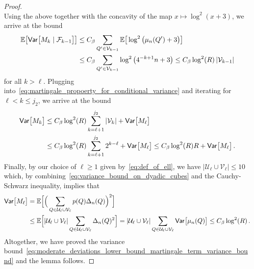 \documentclass[11pt]{amsart}
\theoremstyle{definition}
\theoremstyle{remark}
\numberwithin{equation}{section}
\newcommand{\bE}{\mathbb E}
\newcommand{\Var}{{\sf Var}}
\begin{document}
\begin{proof}
\[		\]
		Using the above together with the concavity of the map $x\mapsto \log^2(x+3)$, we arrive at the bound
		\begin{align*}
			\bE\big[\Var\big[M_k \mid \mathcal{F}_{k-1}\big]\big] & \le C_\beta \sum_{Q^\prime\in \mathcal{V}_{k-1}} \bE\big[\log^2\big( \mu_n(Q^\prime) + 3 \big)\big] \\
			& \le  C_\beta \sum_{Q^\prime\in \mathcal{V}_{k-1}} \log^2\big(4^{-k+1} n + 3\big) \le C_\beta \log^2(R) \, |\mathcal{V}_{k-1}|
		\end{align*}
		for all $k>\ell$. Plugging into~\eqref{eq:martingale_propoerty_for_conditional_variance} and iterating for $\ell<k\le j_2$, we arrive at the bound
		\begin{align*}
			\Var\big[M_k\big] &\le C_\beta \log^2(R) \sum_{k=\ell+1}^{j_2} |\mathcal{V}_{k}| + \Var\big[M_\ell\big]  \\ &\le C_\beta \log^2(R) \sum_{k=\ell+1}^{j_2} 2^{k-\ell} + \Var\big[M_\ell\big] \le C_\beta \log^2(R) R + \Var\big[M_\ell\big] \, . 
		\end{align*}
		Finally, by our choice of $\ell \ge 1$ given by~\eqref{eq:def_of_ell}, we have $|\mathcal{U}_\ell \cup \mathcal{V}_{\ell}|\le 10$ which, by combining~\eqref{eq:variance_bound_on_dyadic_cubes} and the Cauchy-Schwarz inequality, implies that
		\begin{align*}
			\Var\big[M_\ell\big] &= \bE\Big[\Big(\sum_{Q\in \mathcal{U}_\ell \cup \mathcal{V}_\ell} p(Q) \Delta_n(Q)\Big)^2\Big] \\ &\le \bE\Big[|\mathcal{U}_\ell \cup \mathcal{V}_\ell| \sum_{Q\in \mathcal{U}_\ell \cup \mathcal{V}_\ell} \Delta_n(Q)^2 \Big] = |\mathcal{U}_\ell \cup \mathcal{V}_\ell| \sum_{Q\in \mathcal{U}_\ell \cup \mathcal{V}_\ell} \Var\big[\mu_n(Q)\big] \le C_\beta \log^2(R) \, .
		\end{align*}
		Altogether, we have proved the variance bound~\eqref{eq:moderate_deviations_lower_bound_martingale_term_variance_bound} and the lemma follows. 
	\end{proof}
\end{document}
